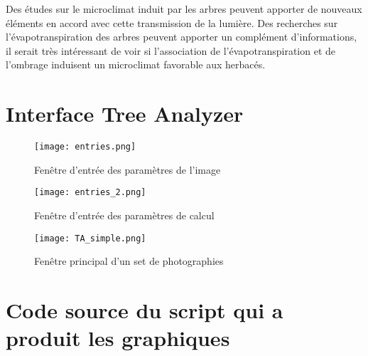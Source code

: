\documentclass[12pt]{report}
\begin{document}
Des études sur le microclimat induit par les arbres peuvent apporter de nouveaux
éléments en accord avec cette transmission de la lumière. Des recherches sur
l'évapotranspiration des arbres peuvent apporter un complément d'informations,
il serait très intéressant de voir si l'association de l'évapotranspiration et
de l'ombrage induisent un microclimat favorable aux herbacés.



\printbibliography
{}

\appendix

\chapter{Interface Tree Analyzer}\label{App:appxA}

\begin{figure}
  \centering
  \texttt{[image: entries.png]}
  \caption{Fenêtre d'entrée des paramètres de l'image}
\end{figure}

\begin{figure}
  \centering
  \texttt{[image: entries\_2.png]}
  \caption{Fenêtre d'entrée des paramètres de calcul}
\end{figure}

\begin{figure}
  \centering
  \texttt{[image: TA\_simple.png]}
  \caption{Fenêtre principal d'un set de photographies}
\end{figure}



\chapter{Code source du script qui a produit les graphiques}\label{App:appxB}
\end{document}
